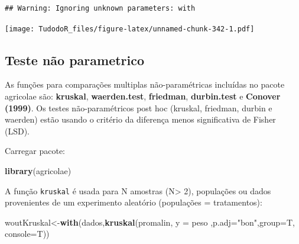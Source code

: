 \documentclass[
]{book}
\newenvironment{Shaded}{\begin{snugshade}}{\end{snugshade}}
\newcommand{\DataTypeTok}[1]{\textcolor[rgb]{0.13,0.29,0.53}{#1}}
\newcommand{\DecValTok}[1]{\textcolor[rgb]{0.00,0.00,0.81}{#1}}
\newcommand{\KeywordTok}[1]{\textcolor[rgb]{0.13,0.29,0.53}{\textbf{#1}}}
\newcommand{\NormalTok}[1]{#1}
\newcommand{\OperatorTok}[1]{\textcolor[rgb]{0.81,0.36,0.00}{\textbf{#1}}}
\newcommand{\StringTok}[1]{\textcolor[rgb]{0.31,0.60,0.02}{#1}}
\begin{document}
\begin{Shaded}
\end{Shaded}

\begin{verbatim}
## Warning: Ignoring unknown parameters: with
\end{verbatim}

\texttt{[image: TudodoR\_files/figure-latex/unnamed-chunk-342-1.pdf]}

\hypertarget{teste-nuxe3o-parametrico}{%
\subsection{Teste não parametrico}\label{teste-nuxe3o-parametrico}}

As funções para comparações multiplas não-paramétricas incluídas no pacote agricolae são: \textbf{kruskal}, \textbf{waerden.test}, \textbf{friedman}, \textbf{durbin.test} e \textbf{Conover (1999)}.
Os testes não-paramétricos post hoc (kruskal, friedman, durbin e waerden) estão usando o critério da diferença menos significativa de Fisher (LSD).

Carregar pacote:

\begin{Shaded}
\begin{Highlighting}[]
\KeywordTok{library}\NormalTok{(agricolae)}
\end{Highlighting}
\end{Shaded}

A função \texttt{kruskal} é usada para N amostras (N\textgreater{} 2), populações ou dados provenientes de um experimento aleatório (populações = tratamentos):

\begin{Shaded}
\begin{Highlighting}[]
\NormalTok{woutKruskal<-}\KeywordTok{with}\NormalTok{(dados,}\KeywordTok{kruskal}\NormalTok{(promalin, }\DataTypeTok{y =}\NormalTok{ peso}
\NormalTok{  ,}\DataTypeTok{p.adj=}\StringTok{"bon"}\NormalTok{,}\DataTypeTok{group=}\NormalTok{T, }\DataTypeTok{console=}\NormalTok{T))}
\end{Highlighting}
\end{Shaded}
\end{document}
